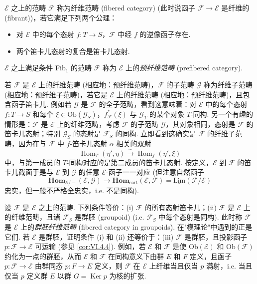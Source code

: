 \begin{definition}\label{def:VI.6.1}
$\mathcal{E}$ 之上的范畴 $\mathcal{F}$ 称为纤维范畴 (fibered category) (此时说函子 $\mathcal{F} \to \mathcal{E}$ 是纤维的 (fibrant))，若它满足下列两个公理：
\begin{itemize}\tightlist
\item[Fib$_1$] 对 $\mathcal{E}$ 中的每个态射 $f \colon T \to S$，$\mathcal{F}$ 中经 $f$ 的逆像函子存在.
\item[Fib$_{II}$] 两个笛卡儿态射的复合是笛卡儿态射.
\end{itemize}
$\mathcal{E}$ 之上满足条件 Fib$_1$ 的范畴 $\mathcal{F}$ 称为 $\mathcal{E}$ 上的\emph{预纤维范畴} (prefibered category).

若 $\mathcal{F}$ 是 $\mathcal{E}$ 上的纤维范畴 (相应地：预纤维范畴)，$\mathcal{F}$ 的子范畴 $\mathcal{G}$ 称为纤维子范畴 (相应地：预纤维子范畴)，若它是 $\mathcal{E}$ 上的纤维范畴 (相应地：预纤维范畴)，且包含函子笛卡儿. 例如若 $\mathcal{G}$ 是 $\mathcal{F}$ 的全子范畴，看到这意味着：对 $\mathcal{E}$ 中的每个态射 $f \colon T \to S$ 和每个 $\xi \in \mathrm{Ob}(\mathcal{G}_S)$，$f_{\mathcal{F}}^{*}(\xi)$ 与 $\mathcal{G}_T$ 的某个对象 $T$-同构. 另一个有趣的情形是：$\mathcal{F}$ 是 $\mathcal{E}$ 上的纤维范畴，考虑 $\mathcal{F}$ 的子范畴 $\mathcal{G}$，其对象相同，态射是 $\mathcal{F}$ 的笛卡儿态射；特别 $\mathcal{G}_S$ 的态射是 $\mathcal{F}_S$ 的同构. 立即看到这确实是 $\mathcal{F}$ 的纤维子范畴，因为在与 $\mathcal{F}$ 中 $f$-笛卡儿态射 $\alpha$ 相关的双射
\[
\operatorname{Hom}_T(\eta', \eta) \xrightarrow{\sim} \operatorname{Hom}_f(\eta', \xi)
\]
中，与第一成员的 $T$-同构对应的是第二成员的笛卡儿态射. 按定义，$\mathcal{E}$ 到 $\mathcal{F}$ 的笛卡儿截面于是与 $\mathcal{E}$ 到 $\mathcal{G}$ 的任意 $\mathcal{E}$-函子一一对应 (但注意自然函子
\[
\mathbf{Hom}_{\mathcal{E}/-}(\mathcal{E}, \mathcal{G}) \longrightarrow \mathbf{Hom}_{\mathrm{cart}}(\mathcal{E}, \mathcal{F}) = \underline{\mathrm{Lim}}(\mathcal{F}/\mathcal{E})
\]
忠实，但一般不严格全忠实，i.e. 不是同构).
\end{definition}

\begin{remarkstar}
设 $\mathcal{F}$ 是 $\mathcal{E}$ 之上的范畴. 下列条件等价：(i) $\mathcal{F}$ 的所有态射笛卡儿；(ii) $\mathcal{F}$ 是 $\mathcal{E}$ 上的纤维范畴，且诸 $\mathcal{F}_S$ 是群胚 (groupoid) (i.e. $\mathcal{F}_S$ 中每个态射是同构). 此时称 $\mathcal{F}$ 是 $\mathcal{E}$ 上的\emph{群胚纤维范畴} (fibered category in groupoids). 在"模理论"中遇到的正是它们. 若 $\mathcal{E}$ 是群胚，证明条件 (i) 和 (ii) 还等价于：(iii) $\mathcal{F}$ 是群胚，且投影函子 $p \colon \mathcal{F} \to \mathcal{E}$ 可运输 (参见 \ref{cor:VI.4.4}). 例如，若 $\mathcal{E}$ 和 $\mathcal{F}$ 是使 $\mathrm{Ob}(\mathcal{E})$ 和 $\mathrm{Ob}(\mathcal{F})$ 约化为一点的群胚，从而 $\mathcal{E}$ 和 $\mathcal{F}$ 在同构意义下由群 $E$ 和 $F$ 定义，且函子 $p \colon \mathcal{F} \to \mathcal{E}$ 由群同态 $p \colon F \to E$ 定义，则 $\mathcal{F}$ 在 $\mathcal{E}$ 上纤维当且仅当 $p$ 满射，i.e. 当且仅当 $p$ 定义群 $E$ 以群 $G = \operatorname{Ker} p$ 为核的扩张.
\end{remarkstar}

